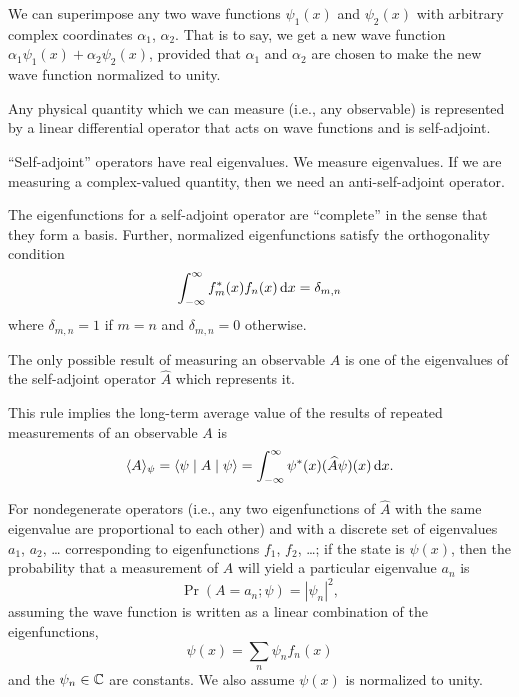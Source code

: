 We can superimpose any two wave functions $\psi_{1}(x)$ and
$\psi_{2}(x)$ with arbitrary complex coordinates $\alpha_{1}$, $\alpha_{2}$.
That is to say, we get a new wave function
$\alpha_{1}\psi_{1}(x) + \alpha_{2}\psi_{2}(x)$, provided that
$\alpha_{1}$ and $\alpha_{2}$ are chosen to make the new wave function
normalized to unity.

Any physical quantity which we can measure (i.e., any observable) is
represented by a linear differential operator that acts on wave functions
and is self-adjoint.

\begin{remark}
``Self-adjoint'' operators have real eigenvalues. We measure
eigenvalues. If we are measuring a complex-valued quantity, then we
need an anti-self-adjoint operator.
\end{remark}

\begin{remark}
The eigenfunctions for a self-adjoint operator are ``complete'' in the
sense that they form a basis. Further, normalized eigenfunctions satisfy
the orthogonality condition
\begin{equation}
\int^{\infty}_{-\infty}f_{m}^{*}(x)f_{n}(x)\,\mathrm{d} x = \delta_{m,n}
\end{equation}
where $\delta_{m,n}=1$ if $m=n$ and $\delta_{m,n}=0$ otherwise.
\end{remark}

The only possible result of measuring an observable $A$ is one of the
eigenvalues of the self-adjoint operator $\widehat{A}$ which represents
it.

\begin{remark}
This rule implies the long-term average value of the results of repeated
measurements of an observable $A$ is
\begin{equation}
\langle A\rangle_{\psi} = \langle\psi\mid A\mid\psi\rangle = \int^{\infty}_{-\infty}\psi^{*}(x)(\widehat{A}\psi)(x)\,\mathrm{d} x.
\end{equation}
\end{remark}

\M
For nondegenerate operators (i.e., any two eigenfunctions of
$\widehat{A}$ with the same eigenvalue are proportional to each other)
and with a discrete set of eigenvalues $a_{1}$, $a_{2}$, \dots
corresponding to eigenfunctions $f_{1}$, $f_{2}$, \dots; if the state is
$\psi(x)$, then the probability that a measurement of $A$ will yield a
particular eigenvalue $a_{n}$ is
\begin{equation}
\Pr(A = a_{n}; \psi) = |\psi_{n}|^{2},
\end{equation}
assuming the wave function is written as a linear combination of the
eigenfunctions,
\begin{equation}
\psi(x) = \sum_{n}\psi_{n}f_{n}(x)
\end{equation}
and the $\psi_{n}\in\mathbb{C}$ are constants. We also assume $\psi(x)$ is
normalized to unity.

